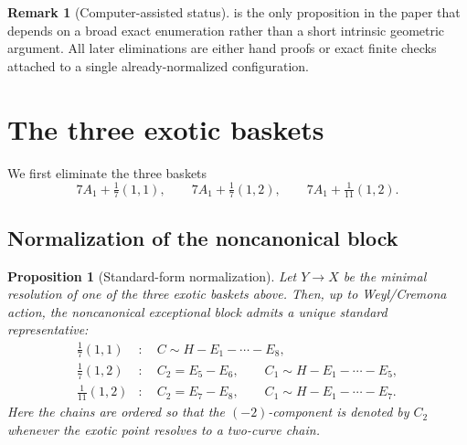\documentclass[11pt]{article}
\newtheorem{proposition}[proposition]{Proposition}
\theoremstyle{definition}
\newtheorem{remark}[remark]{Remark}
\begin{document}
\begin{remark}[Computer-assisted status]\label{rem:computer-assisted}
 is the only proposition in the paper that depends on a broad exact enumeration rather than a short intrinsic geometric argument. All later eliminations are either hand proofs or exact finite checks attached to a single already-normalized configuration.
\end{remark}

\section{The three exotic baskets}\label{sec:exotic}
We first eliminate the three baskets
\[
7A_1+\tfrac17(1,1),\qquad 7A_1+\tfrac17(1,2),\qquad 7A_1+\tfrac1{11}(1,2).
\]

\subsection{Normalization of the noncanonical block}

\begin{proposition}[Standard-form normalization]\label{prop:exotic-normalization}
Let $Y\to X$ be the minimal resolution of one of the three exotic baskets above. Then, up to Weyl/Cremona action, the noncanonical exceptional block admits a unique standard representative:
\begin{align*}
\tfrac17(1,1) &:\quad C\sim H-E_1-\cdots-E_8,\\
\tfrac17(1,2) &:\quad C_2=E_5-E_6,\qquad C_1\sim H-E_1-\cdots-E_5,\\
\tfrac1{11}(1,2) &:\quad C_2=E_7-E_8,\qquad C_1\sim H-E_1-\cdots-E_7.
\end{align*}
Here the chains are ordered so that the $(-2)$-component is denoted by $C_2$ whenever the exotic point resolves to a two-curve chain.
\end{proposition}
\end{document}
